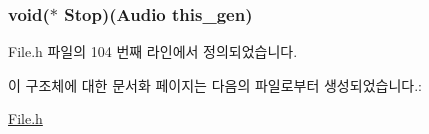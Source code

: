 \hypertarget{struct___audio_a04a848082fe555df88ae9bc35f4223d3}{
\subsubsection[{Stop}]{\setlength{\rightskip}{0pt plus 5cm}void($\ast$  Stop)({\bf Audio} this\-\_\-gen)}}\label{struct___audio_a04a848082fe555df88ae9bc35f4223d3}


File.\-h 파일의 104 번째 라인에서 정의되었습니다.



이 구조체에 대한 문서화 페이지는 다음의 파일로부터 생성되었습니다.\-:\begin{DoxyCompactItemize}
\item 
\hyperlink{_file_8h}{File.\-h}\end{DoxyCompactItemize}
